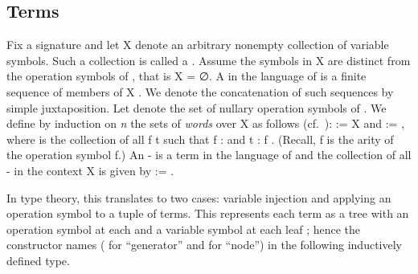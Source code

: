 \begin{code}
\AgdaSymbol{(}\AgdaSpace{}%
\AgdaOperator{\AgdaInductiveConstructor{,}}\AgdaSpace{}%
\AgdaSymbol{)}\AgdaSpace{}%
\AgdaSymbol{=}\AgdaSpace{}%
\AgdaSymbol{(}\AgdaSpace{}%
\AgdaSymbol{(}\AgdaSpace{}%
\AgdaSymbol{)}\AgdaSpace{}%
\AgdaSymbol{)}\AgdaSpace{}%
\AgdaOperator{\AgdaInductiveConstructor{,}}\AgdaSpace{}%
\AgdaSymbol{(}\AgdaSpace{}%
\AgdaSpace{}%
\AgdaSpace{}%
\AgdaSpace{}%
\AgdaSpace{}%
\AgdaSpace{}%
\AgdaSpace{}%
\AgdaSpace{}%
\AgdaSymbol{(}\AgdaSpace{}%
\AgdaSymbol{)}\AgdaSpace{}%
\AgdaSymbol{)}\<%
\end{code}
\fi


\subsection{Terms}
\label{terms}
Fix a signature  and let \ab X denote an arbitrary nonempty collection of variable
symbols. Such a collection is called a .
Assume the symbols in \ab X are distinct from the operation symbols of
, that is \ab X     = ∅.
A  in the language of  is a finite sequence of members of \ab X 
. We denote the concatenation of such sequences by simple juxtaposition.
Let  denote the set of nullary operation symbols of . We define by induction
on \textit{n} the sets  of \emph{words} over \ab X   as
follows (cf.~\cite[Def. 4.19]{Bergman:2012}):  := \ab X   and
 :=   , where  is the collection of all \ab f \ab t
such that \ab f :  and \ab t :  \ab f 
.
\ifshort\else
(Recall,  \ab f is the arity of the operation symbol \ab f.)
\fi
An - is a term in the language of  and the collection of all
- in the context \ab X is given by  :=  .

In type theory, this translates to two cases: variable injection and applying an
operation symbol to a tuple of terms. This represents each term as a tree
with an operation symbol at each  and a variable symbol at each leaf ;
hence the constructor names ( for ``generator'' and  for ``node'') in the
following inductively defined type.

